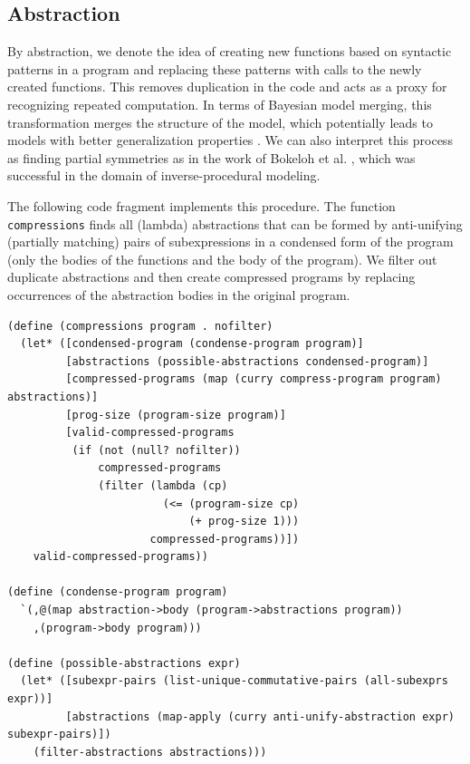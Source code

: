 \documentclass[a4paper,10pt]{article}
\begin{document}
\subsection{Abstraction}

By abstraction, we denote the idea of creating new functions based on syntactic patterns in a program and replacing these patterns with calls to the newly created functions.
This removes duplication in the code and acts as a proxy for recognizing repeated computation.
In terms of Bayesian model merging, this transformation merges the structure of the model, which potentially leads to models with better generalization properties \cite{Stolcke:1994:IPG:645515.658235}. We can also interpret this process as finding partial symmetries as in the work of Bokeloh et al. \cite{DBLP:journals/tog/BokelohWS10}, which was successful in the domain of inverse-procedural modeling.

The following code fragment implements this procedure. The function \texttt{compressions} finds all (lambda) abstractions that can be formed by anti-unifying (partially matching) pairs of subexpressions in a condensed form of the program (only the bodies of the functions and the body of the program). We filter out duplicate abstractions and then create compressed programs by replacing occurrences of the abstraction bodies in the original program.

\begin{lstlisting}[frame=trbl]
(define (compressions program . nofilter)
  (let* ([condensed-program (condense-program program)]
         [abstractions (possible-abstractions condensed-program)]
         [compressed-programs (map (curry compress-program program) abstractions)]
         [prog-size (program-size program)]
         [valid-compressed-programs
          (if (not (null? nofilter))
              compressed-programs
              (filter (lambda (cp)
                        (<= (program-size cp)
                            (+ prog-size 1)))
                      compressed-programs))])
    valid-compressed-programs))

(define (condense-program program)
  `(,@(map abstraction->body (program->abstractions program))
    ,(program->body program)))

(define (possible-abstractions expr)
  (let* ([subexpr-pairs (list-unique-commutative-pairs (all-subexprs expr))]
         [abstractions (map-apply (curry anti-unify-abstraction expr) subexpr-pairs)])
    (filter-abstractions abstractions)))
\end{lstlisting}
\end{document}
